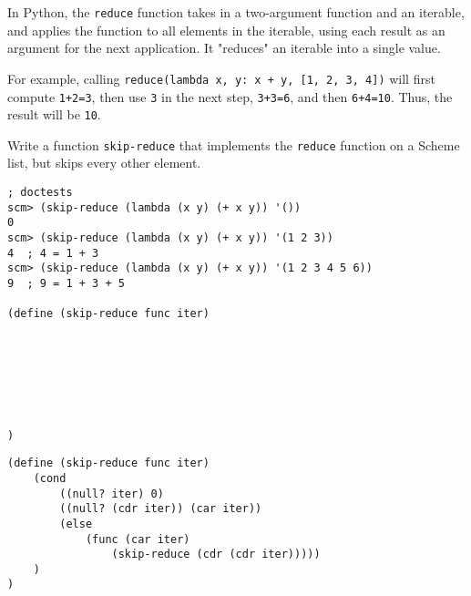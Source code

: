 \question
In Python, the \lstinline{reduce} function takes in a two-argument function and an iterable, and applies the function to all elements in the iterable, using each result as an argument for the next application. It "reduces" an iterable into a single value.

For example, calling \lstinline{reduce(lambda x, y: x + y, [1, 2, 3, 4])} will first compute \lstinline{1+2=3}, then use \lstinline{3} in the next step, \lstinline{3+3=6}, and then \lstinline{6+4=10}. Thus, the result will be \lstinline{10}.

Write a function \lstinline{skip-reduce} that implements the \lstinline{reduce} function on a Scheme list, but skips every other element.

\begin{lstlisting}
; doctests
scm> (skip-reduce (lambda (x y) (+ x y)) '())
0
scm> (skip-reduce (lambda (x y) (+ x y)) '(1 2 3))
4  ; 4 = 1 + 3
scm> (skip-reduce (lambda (x y) (+ x y)) '(1 2 3 4 5 6))
9  ; 9 = 1 + 3 + 5

(define (skip-reduce func iter)







)
\end{lstlisting}

\begin{solution}
\begin{lstlisting}
(define (skip-reduce func iter)
    (cond
        ((null? iter) 0)
        ((null? (cdr iter)) (car iter))
        (else
            (func (car iter) 
                (skip-reduce (cdr (cdr iter)))))
    )
)
\end{lstlisting}
\end{solution}